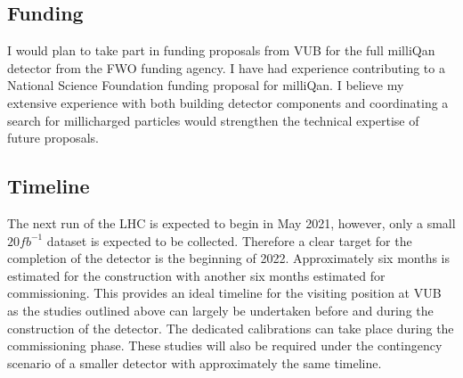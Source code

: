 \documentclass[11pt]{article}
\theoremstyle{plain} \numberwithin{equation}{section}
\theoremstyle{definition}
\begin{document}
\subsection*{Funding}

I would plan to take part in funding proposals from VUB for the full milliQan detector
from the FWO funding agency. I have had experience contributing to a National Science
Foundation funding proposal for milliQan. I believe my extensive 
experience with both building detector components and coordinating 
a search for millicharged particles would strengthen the technical
expertise of future proposals.

\subsection*{Timeline}

The next run of the LHC is expected to begin in May 2021, however, only a small $20fb^{-1}$ dataset is 
expected to be collected. Therefore a clear target for the completion of the detector
is the beginning of 2022. Approximately six months is estimated for the construction with another six months
estimated for commissioning. This provides an ideal timeline for the visiting position at VUB as 
the studies outlined above can largely be undertaken before and during the construction of the detector.
The dedicated calibrations can take place during the commissioning phase. These studies will also be
required under the contingency scenario of a smaller detector with approximately the same timeline.
\end{document}
